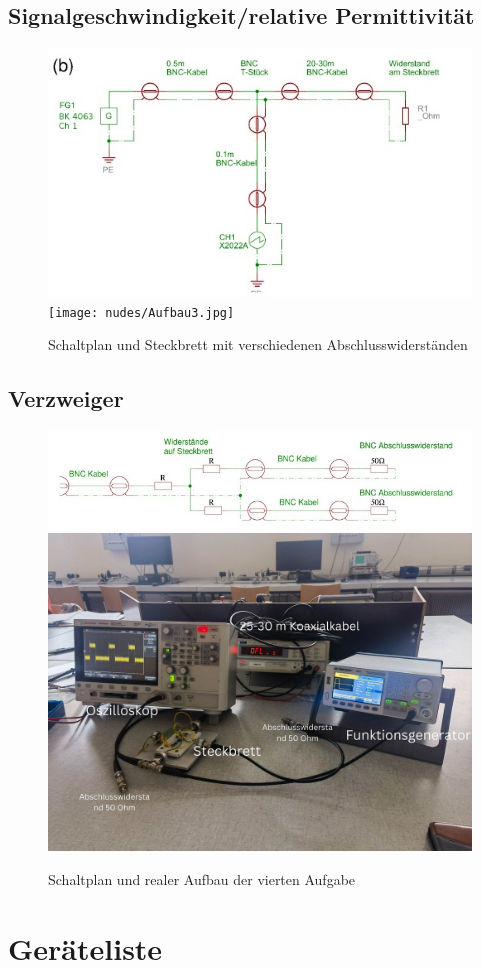 \documentclass[12pt,a4paper,twoside]{article}
\begin{document}
\subsection{Signalgeschwindigkeit/relative Permittivität}

\begin{figure}[H]
    \centering
    \includegraphics[width=0.4\linewidth]{nudes/Aufgabe 2,3 Schaltplan.jpg}
    \texttt{[image: nudes/Aufbau3.jpg]}
    \caption{Schaltplan und Steckbrett mit verschiedenen Abschlusswiderständen}
    \label{fig:Aufbau3}
\end{figure}

\subsection{Verzweiger}

\begin{figure}[H]
    \centering
    \includegraphics[width=0.4\linewidth]{nudes/Aufgabe 4 Schaltplan.jpg}
    \includegraphics[width=0.4\linewidth]{nudes/Aufbau4.jpg}
    \caption{Schaltplan und realer Aufbau der vierten Aufgabe}
    \label{fig:Aufbau4}
\end{figure}


    
\section{Geräteliste} %
\end{document}
